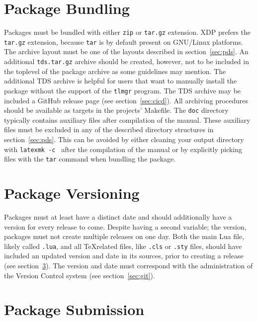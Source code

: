 \documentclass{xdpdoc}
\begin{document}
\begin{multicols}{2}
        \section{Package Bundling}\label{sec:bundling}

        Packages must be bundled with either \texttt{zip} or \texttt{tar.gz} extension.
        XDP prefers the \texttt{tar.gz} extension, because \texttt{tar} is by default present on GNU/Linux platforms.
        The archive layout must be one of the layouts described in section~\ref{sec:pds}.
        An additional \texttt{tds.tar.gz} archive should be created, however, not to be included in the toplevel of the package archive as some guidelines may mention.
        The additional TDS archive is helpful for users that want to manually install the package without the support of the \texttt{tlmgr} program.
        The TDS archive may be included a GitHub release page (see section~\ref{sec:cicd}).
        All archiving procedures should be available as targets in the projects' Makefile.
        The \texttt{doc} directory typically contains auxiliary files after compilation of the manual.
        These auxiliary files must be excluded in any of the described directory structures in section~\ref{sec:pds}.
        This can be avoided by either cleaning your output directory with \texttt{latexmk -c } after the compilation of the manual
        or by explicitly picking files with the \texttt{tar} command when bundling the package.


        \section{Package Versioning}\label{sec:package-versioning}

        Packages must at least have a distinct date and should additionally have a version for every release to come.
        Despite having a second variable; the version, packages must not create multiple releases on one day.
        Both the main Lua file, likely called \texttt{.lua}, and all \TeX related files,
        like \texttt{.cls} or \texttt{.sty} files,
        should have included an updated version and date in its sources, prior to creating a release
        (see section~\ref{sec:submission}).
        The version and date must correspond with the administration of the Version Control system (see section~\ref{sec:git}).


        \section{Package Submission}\label{sec:submission}


\end{multicols}
\end{document}
